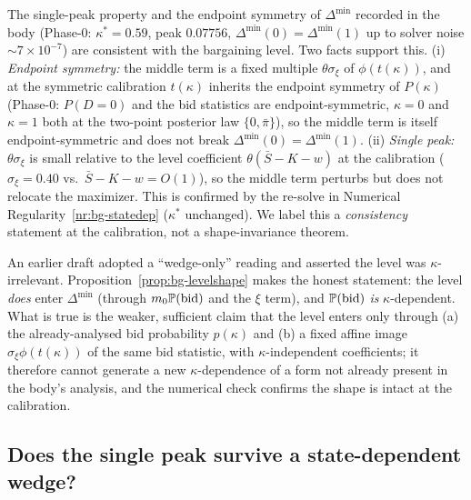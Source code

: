 \begin{corollary}
\label{cor:bg-shape}
The single-peak property and the endpoint symmetry of $\Delta^{\min}$ recorded in
the body (Phase-0: $\kappa^{\ast}=0.59$, peak $0.07756$,
$\Delta^{\min}(0)=\Delta^{\min}(1)$ up to solver noise $\sim7\times10^{-7}$) are
consistent with the bargaining level. Two facts support this. (i) \emph{Endpoint
symmetry:} the middle term is a fixed multiple $\theta\sigma_\xi$ of
$\phi(t(\kappa))$, and at the symmetric calibration $t(\kappa)$ inherits the
endpoint symmetry of $P(\kappa)$ (Phase-0: $P(D{=}0)$ and the bid statistics are
endpoint-symmetric, $\kappa{=}0$ and $\kappa{=}1$ both at the two-point posterior
law $\{0,\bar\pi\}$), so the middle term is itself endpoint-symmetric and does not
break $\Delta^{\min}(0)=\Delta^{\min}(1)$. (ii) \emph{Single peak:} $\theta
\sigma_\xi$ is small relative to the level coefficient $\theta(\bar S-K-w)$ at the
calibration ($\sigma_\xi=0.40$ vs.\ $\bar S-K-w=O(1)$), so the middle term
perturbs but does not relocate the maximizer. This is confirmed by the re-solve
in Numerical Regularity~\ref{nr:bg-statedep} ($\kappa^{\ast}$ unchanged). We label
this a \emph{consistency} statement at the calibration, not a shape-invariance
theorem.
\end{corollary}

\begin{remark}
\label{rem:bg-levels}
An earlier draft adopted a ``wedge-only'' reading and asserted the level was
$\kappa$-irrelevant. Proposition~\ref{prop:bg-levelshape} makes the honest
statement: the level \emph{does} enter $\Delta^{\min}$ (through
$m_{0}\mathbb{P}(\text{bid})$ and the $\xi$ term), and $\mathbb{P}(\text{bid})$ \emph{is}
$\kappa$-dependent. What is true is the weaker, sufficient claim that the level
enters only through (a) the already-analysed bid probability $p(\kappa)$ and (b) a
fixed affine image $\sigma_\xi\phi(t(\kappa))$ of the same bid statistic, with
$\kappa$-independent coefficients; it therefore cannot generate a new
$\kappa$-dependence of a form not already present in the body's analysis, and the
numerical check confirms the shape is intact at the calibration.
\end{remark}

\subsection{Does the single peak survive a state-dependent wedge?}
\label{app:bg-statedep}

